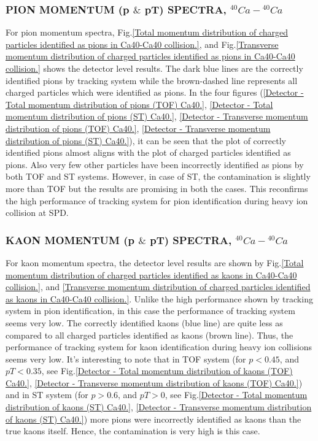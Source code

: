 \documentclass[12pt, twocolumn]{article}
\begin{document}
\subsubsection{PION MOMENTUM (p $\&$ pT) SPECTRA, $^{40}Ca-{^{40}Ca}$}
For pion momentum spectra, Fig.\ref{Total momentum distribution of charged particles identified as pions in Ca40-Ca40 collision.}, and Fig.\ref{Transverse momentum distribution of charged particles identified as pions in Ca40-Ca40 collision.} shows the detector level results. The dark blue lines are the correctly identified pions by tracking system while the brown-dashed line represents all charged particles which were identified as pions. In the four figures (\ref{Detector - Total momentum distribution of pions (TOF) Ca40.}, \ref{Detector - Total momentum distribution of pions (ST) Ca40.}, \ref{Detector - Transverse momentum distribution of pions (TOF) Ca40.}, \ref{Detector - Transverse momentum distribution of pions (ST) Ca40.}), it can be seen that the plot of correctly identified pions almost aligns with the plot of  charged particles identified as pions. Also very few other particles have been incorrectly identified as pions by both TOF and ST systems. However, in case of ST, the contamination is slightly more than TOF but the results are promising in both the cases. This reconfirms the high performance of tracking system for pion identification during heavy ion collision at SPD.      

\subsubsection{KAON MOMENTUM (p $\&$ pT) SPECTRA, $^{40}Ca-{^{40}Ca}$}
\label{KAON MOMENTUM (p and pT) SPECTRA, Ca40-Ca40}
For kaon momentum spectra, the detector level results are shown by Fig.\ref{Total momentum distribution of charged particles identified as kaons in Ca40-Ca40 collision.}, and \ref{Transverse momentum distribution of charged particles identified as kaons in Ca40-Ca40 collision.}. Unlike the high performance shown by tracking system in pion identification, in this case the performance of tracking system seems very low. The correctly identified kaons (blue line) are quite less as compared to all charged particles identified as kaons (brown line). Thus, the performance of tracking system for kaon identification during heavy ion collisions seems very low. It's interesting to note that in TOF system (for $p < 0.45$, and $pT < 0.35$, see Fig.\ref{Detector - Total momentum distribution of kaons (TOF) Ca40.}, \ref{Detector - Transverse momentum distribution of kaons (TOF) Ca40.}) and in ST system (for $p > 0.6$, and $pT > 0$, see Fig.\ref{Detector - Total momentum distribution of kaons (ST) Ca40.}, \ref{Detector - Transverse momentum distribution of kaons (ST) Ca40.}) more pions were incorrectly identified as kaons than the true kaons itself. Hence, the contamination is very high is this case.
\end{document}
